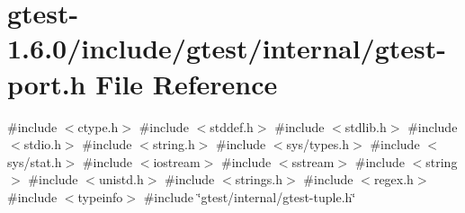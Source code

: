 \hypertarget{gtest-port_8h}{\section{gtest-\/1.6.0/include/gtest/internal/gtest-\/port.h \-File \-Reference}
\label{d3/dc9/gtest-port_8h}
}
{\ttfamily \#include $<$ctype.\-h$>$}\*
{\ttfamily \#include $<$stddef.\-h$>$}\*
{\ttfamily \#include $<$stdlib.\-h$>$}\*
{\ttfamily \#include $<$stdio.\-h$>$}\*
{\ttfamily \#include $<$string.\-h$>$}\*
{\ttfamily \#include $<$sys/types.\-h$>$}\*
{\ttfamily \#include $<$sys/stat.\-h$>$}\*
{\ttfamily \#include $<$iostream$>$}\*
{\ttfamily \#include $<$sstream$>$}\*
{\ttfamily \#include $<$string$>$}\*
{\ttfamily \#include $<$unistd.\-h$>$}\*
{\ttfamily \#include $<$strings.\-h$>$}\*
{\ttfamily \#include $<$regex.\-h$>$}\*
{\ttfamily \#include $<$typeinfo$>$}\*
{\ttfamily \#include \char`\"{}gtest/internal/gtest-\/tuple.\-h\char`\"{}}\*

